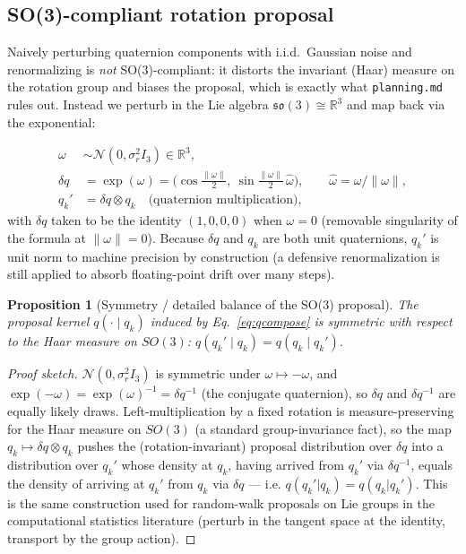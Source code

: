 \documentclass[11pt]{article}
\newtheorem{proposition}{Proposition}
\begin{document}
\subsection{SO(3)-compliant rotation proposal}
\label{sec:so3}

Naively perturbing quaternion components with i.i.d.\ Gaussian noise and
renormalizing is \emph{not} SO(3)-compliant: it distorts the invariant (Haar)
measure on the rotation group and biases the proposal, which is exactly what
\texttt{planning.md} rules out. Instead we perturb in the Lie algebra
$\mathfrak{so}(3) \cong \mathbb{R}^3$ and map back via the exponential:

\begin{align}
  \omega &\sim \mathcal{N}(0, \sigma_r^2 I_3) \in \mathbb{R}^3, \\
  \delta q &= \exp(\omega) = \Big(\cos\tfrac{\|\omega\|}{2},\ \sin\tfrac{\|\omega\|}{2}\,\hat\omega\Big), \qquad \hat\omega = \omega / \|\omega\|, \\
  q_k' &= \delta q \otimes q_k \quad \text{(quaternion multiplication)}, \label{eq:qcompose}
\end{align}
with $\delta q$ taken to be the identity $(1,0,0,0)$ when $\omega = 0$ (removable
singularity of the formula at $\|\omega\|=0$). Because $\delta q$ and $q_k$
are both unit quaternions, $q_k'$ is unit norm to machine precision by
construction (a defensive renormalization is still applied to absorb
floating-point drift over many steps).

\begin{proposition}[Symmetry / detailed balance of the SO(3) proposal]
\label{prop:so3-symmetric}
The proposal kernel $q(\cdot \mid q_k)$ induced by
Eq.~\eqref{eq:qcompose} is symmetric with respect to the Haar measure on
$SO(3)$: $q(q_k' \mid q_k) = q(q_k \mid q_k')$.
\end{proposition}
\begin{proof}[Proof sketch]
$\mathcal{N}(0,\sigma_r^2 I_3)$ is symmetric under $\omega \mapsto -\omega$,
and $\exp(-\omega) = \exp(\omega)^{-1} = \delta q^{-1}$ (the conjugate
quaternion), so $\delta q$ and $\delta q^{-1}$ are equally likely draws.
Left-multiplication by a fixed rotation is measure-preserving for the Haar
measure on $SO(3)$ (a standard group-invariance fact), so the map
$q_k \mapsto \delta q \otimes q_k$ pushes the (rotation-invariant) proposal
distribution over $\delta q$ into a distribution over $q_k'$ whose density
at $q_k$, having arrived from $q_k'$ via $\delta q^{-1}$, equals the density
of arriving at $q_k'$ from $q_k$ via $\delta q$ --- i.e. $q(q_k' | q_k) =
q(q_k | q_k')$. This is the same construction used for random-walk proposals
on Lie groups in the computational statistics literature (perturb in the
tangent space at the identity, transport by the group action).
\end{proof}
\end{document}
